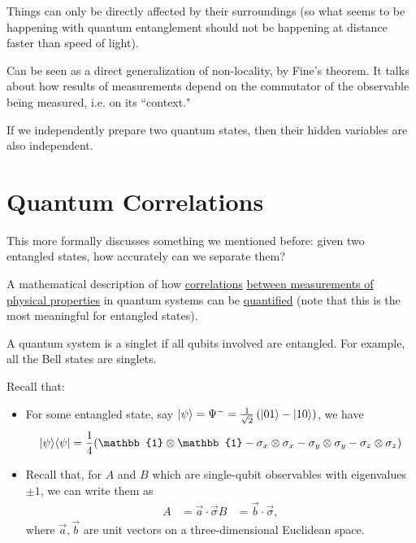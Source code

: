 \documentclass[12pt]{article}
\begin{document}
\begin{definition}[Locality]
Things can only be directly affected by their surroundings (so what seems to be happening with quantum entanglement should not be happening at distance faster than speed of light).
\end{definition}

\begin{definition}[Contextuality]
Can be seen as a direct generalization of non-locality, by Fine's theorem. It talks about how results of measurements depend on the commutator of the observable being measured, i.e. on its ``context." 
\end{definition}

\begin{definition}
If we independently prepare two quantum states, then their hidden variables are also independent.
\end{definition}

\section{Quantum Correlations}
This more formally discusses something we mentioned before: given two entangled states, how accurately can we separate them?

\begin{definition}
A mathematical description of how \underline{correlations} \underline{between measurements of physical properties} in quantum systems can be \underline{quantified} (note that this is the most meaningful for entangled states). 
\end{definition}

\begin{definition}[Singlet]
A quantum system is a singlet if all qubits involved are entangled. For example, all the Bell states are singlets.
\end{definition}

\noindent Recall that:
\begin{itemize}
    \item For some entangled state, say $|\psi\rangle = \Psi^- = \frac{1}{\sqrt{2}}\left(|01\rangle - |10\rangle\right)$, we have $$
    \kb{\psi}{\psi} = \frac{1}{4}(\mathbb{1}\otimes \mathbb{1} - \sigma_x \otimes \sigma_x - \sigma_y \otimes \sigma_y - \sigma_z \otimes \sigma_z)
    $$
    \item Recall that, for $A$ and $B$ which are single-qubit observables with eigenvalues $\pm 1$, we can write them as $$
    \begin{aligned}
        A &= \vec{a}\cdot \vec{\sigma}
        B &= \vec{b}\cdot \vec{\sigma},
    \end{aligned}
    $$ where $\vec{a}, \vec{b}$ are unit vectors on a three-dimensional Euclidean space.
\end{itemize}
\end{document}
